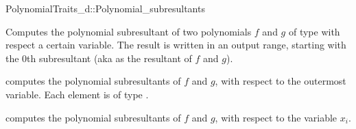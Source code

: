 \begin{ccRefConcept}{PolynomialTraits_d::Polynomial_subresultants}
\ccDefinition

Computes the polynomial subresultant of two polynomials $f$ and $g$ of 
type  with respect a certain variable.
The result is written in an output range, starting with the $0$th subresultant
(aka as the resultant of $f$ and $g$).

\ccOperations
{}
         { computes the polynomial subresultants of $f$ and $g$, 
           with respect to the outermost variable. Each element is of type
           .}

         { computes the polynomial subresultants of $f$ and $g$, 
           with respect to the variable $x_i$.}


\ccSeeAlso

\\
\\

\end{ccRefConcept}
